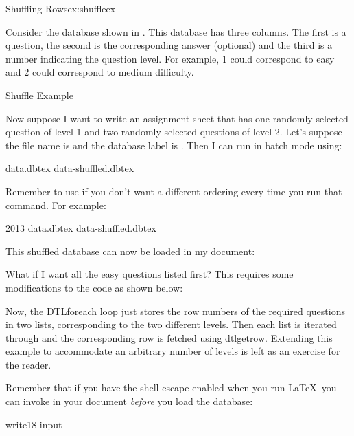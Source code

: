\begin{example}{Shuffling Rows}{ex:shuffleex}

Consider the database shown in . This database
has three columns. The first is a question, the second is the 
corresponding answer (optional) and the third is a number indicating 
the question level.  For example, 1 could correspond to easy and 2 could 
correspond to medium difficulty.

 {%
 }
 {Shuffle Example}

Now suppose I want to write an assignment sheet that has one randomly
selected question of level 1 and two randomly selected questions of
level 2. Let's suppose the file name is 
and the database label is . Then I can run 
in batch mode using:
\begin{terminal}
   data.dbtex  data-shuffled.dbtex
\end{terminal}
Remember to use  if you don't want a different
ordering every time you run that command. For example:
\begin{terminal}
  2013   data.dbtex  data-shuffled.dbtex
\end{terminal}
This shuffled database can now be loaded in my document:

What if I want all the easy questions listed first? This requires 
some modifications to the code as shown below:


Now, the \gls{DTLforeach} loop just stores the row numbers of the
required questions in two lists, corresponding to the two different levels.
Then each list is iterated through and the corresponding row is fetched
using \gls{dtlgetrow}. Extending this example to accommodate an
arbitrary number of levels is left as an exercise for the reader.

Remember that if you have the shell escape enabled when you run \LaTeX\ you
can invoke  in your document \emph{before} you load the database:
\begin{codebox}
\gls{write18}
\codepar
\gls{input}
\end{codebox}
\end{example}


